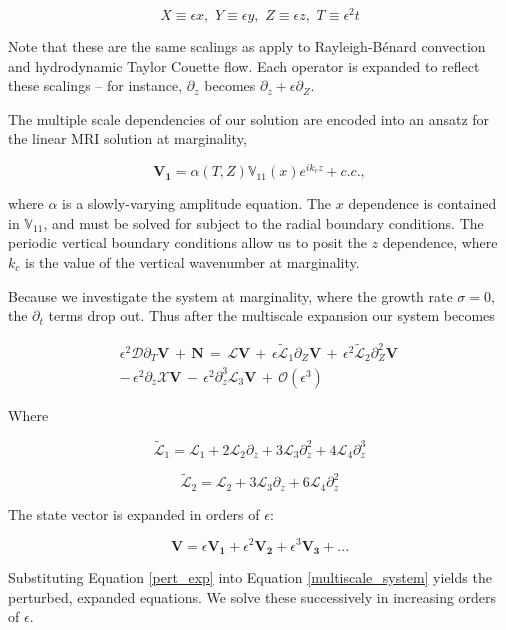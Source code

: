 \documentclass{emulateapj}
\newcommand{\beq}{\begin{equation}}
\newcommand{\eeq}{\end{equation}}
\begin{document}
\beq
X \equiv \epsilon x,  \, \, Y \equiv \epsilon y, \, \, Z \equiv \epsilon z, \, \, T \equiv \epsilon^2 t
\eeq

Note that these are the same scalings as apply to Rayleigh-B\'enard convection and hydrodynamic Taylor Couette flow. Each operator is expanded to reflect these scalings -- for instance, $\partial_z$ becomes $\partial_z + \epsilon\partial_Z$. 

The multiple scale dependencies of our solution are encoded into an ansatz for the linear MRI solution at marginality,

\beq
\label{V1_ansatz}
\mathbf{V_1} = \alpha(T, Z) \mathbb{V}_{11}(x) e^{i k_c z} + c.c.,
\eeq

where $\alpha$ is a slowly-varying amplitude equation. The $x$ dependence is contained in $\mathbb{V}_{11}$, and must be solved for subject to the radial boundary conditions. The periodic vertical boundary conditions allow us to posit the $z$ dependence, where $k_c$ is the value of the vertical wavenumber at marginality. 

Because we investigate the system at marginality, where the growth rate $\sigma = 0$, the $\partial_t$ terms drop out. Thus after the multiscale expansion our system becomes

\begin{multline}
\label{multiscale_system}
\epsilon^2 \mathcal{D}\partial_T\mathbf{V} \, + \, \mathbf{N} \, = \, \mathcal{L}\mathbf{V} \, + \, \epsilon\widetilde{\mathcal{L}}_1\partial_Z\mathbf{V} \, + \, \epsilon^2\widetilde{\mathcal{L}}_2\partial_Z^2\mathbf{V} \, \\
 - \, \epsilon^2\partial_z\mathcal{X}\mathbf{V} \, - \, \epsilon^2\partial_z^3\mathcal{L}_3\mathbf{V} \, + \, \mathcal{O}(\epsilon^3)
\end{multline}

Where

\beq
\widetilde{\mathcal{L}}_1 = \mathcal{L}_1 + 2\mathcal{L}_2\partial_z + 3\mathcal{L}_3\partial_z^2 + 4\mathcal{L}_4\partial_z^3
\eeq

\beq
\widetilde{\mathcal{L}}_2 = \mathcal{L}_2 + 3\mathcal{L}_3\partial_z + 6\mathcal{L}_4\partial_z^2
\eeq


The state vector is expanded in orders of $\epsilon$:

\beq
\label{pert_exp}
\mathbf{V} = \epsilon\mathbf{V_1} + \epsilon^2\mathbf{V_2} + \epsilon^3\mathbf{V_3} + ...
\eeq

Substituting Equation \ref{pert_exp} into Equation \ref{multiscale_system} yields the perturbed, expanded equations. We solve these successively in increasing orders of $\epsilon$.
\end{document}
